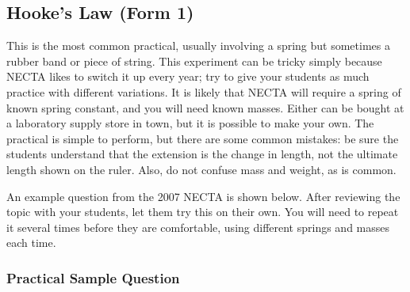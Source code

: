 \documentclass[12pt,a4paper]{report}
\begin{document}
\subsection{Hooke’s Law (Form 1)}

This is the most common practical, usually involving a spring but sometimes a
rubber band or piece of string. This experiment can be tricky simply because NECTA
likes to switch it up every year; try to give your students as much practice with different
variations. It is likely that NECTA will require a spring of known spring constant, and
you will need known masses. Either can be bought at a laboratory supply store in town,
but it is possible to make your own. The practical is simple to perform, but there are
some common mistakes: be sure the students understand that the extension is the change
in length, not the ultimate length shown on the ruler. Also, do not confuse mass and
weight, as is common.

An example question from the 2007 NECTA is shown below. After reviewing
the topic with your students, let them try this on their own. You will need to repeat it
several times before they are comfortable, using different springs and masses each time.

\subsubsection{Practical Sample Question}
\end{document}
